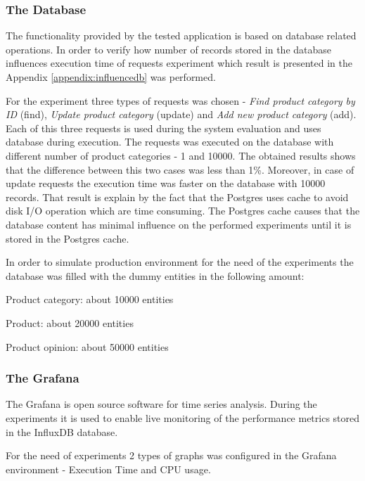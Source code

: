 \documentclass[12pt,a4paper]{article}
\let\tempone\itemize
\let\temptwo\enditemize
\renewenvironment{itemize}{\tempone\addtolength{\itemsep}{-0.4\baselineskip}}{\temptwo}
\begin{document}
\subsubsection{The Database}

The functionality provided by the tested application is based on database related operations. In order to verify how number of records stored in the database influences execution time of requests experiment which result is presented in the Appendix \ref{appendix:influencedb} was performed. 

For the experiment three types of requests was chosen - \textit{Find product category by ID} (find), \textit{Update product category} (update) and \textit{Add new product category} (add). Each of this three requests is used during the system evaluation and uses database during execution. The requests was executed on the database with different number of product categories - 1 and 10000. The obtained results shows that the difference between this two cases was less than 1\%. Moreover, in case of update requests the execution time was faster on the database with 10000 records. That result is explain by the fact that the Postgres uses cache to avoid disk I/O operation which are time consuming. The Postgres cache causes that the database content has minimal influence on the performed experiments until it is stored in the Postgres cache. 

In order to simulate production environment for the need of the experiments the database was filled with the dummy entities in the following amount: 

\begin{itemize}
\item Product category: about 10000 entities
\item Product: about 20000 entities
\item Product opinion: about 50000 entities
\end{itemize}

\subsubsection{The Grafana}

The Grafana is open source software for time series analysis. During the experiments it is used to enable live monitoring of the performance metrics stored in the InfluxDB database. 

For the need of experiments 2 types of graphs was configured in the Grafana environment - Execution Time and CPU usage. 
\end{document}

